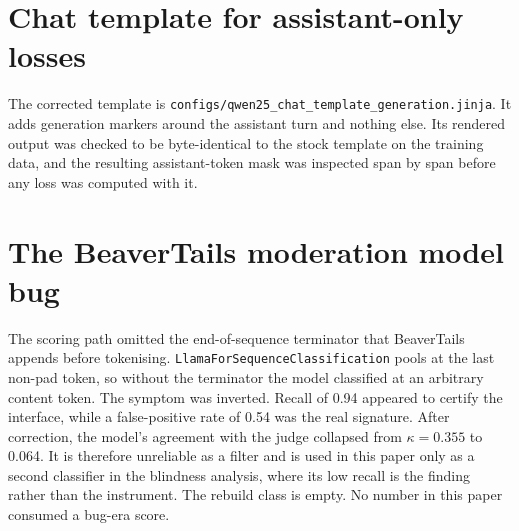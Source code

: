 \documentclass[10pt]{article} %
\begin{document}
\section{Chat template for assistant-only losses}
\label{app:template}
The corrected template is \texttt{configs/qwen25\_chat\_template\_generation.jinja}. It adds generation markers around the assistant turn and nothing else. Its rendered output was checked to be byte-identical to the stock template on the training data, and the resulting assistant-token mask was inspected span by span before any loss was computed with it.

\section{The BeaverTails moderation model bug}
\label{app:beaverdam}
The scoring path omitted the end-of-sequence terminator that BeaverTails appends before tokenising. \texttt{LlamaForSequenceClassification} pools at the last non-pad token, so without the terminator the model classified at an arbitrary content token. The symptom was inverted. Recall of 0.94 appeared to certify the interface, while a false-positive rate of 0.54 was the real signature. After correction, the model's agreement with the judge collapsed from $\kappa=0.355$ to 0.064. It is therefore unreliable as a filter and is used in this paper only as a second classifier in the blindness analysis, where its low recall is the finding rather than the instrument. The rebuild class is empty. No number in this paper consumed a bug-era score.
\end{document}
